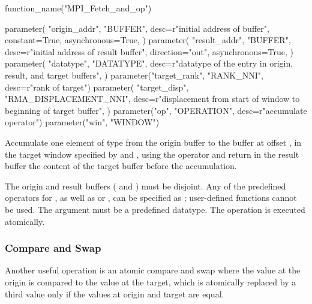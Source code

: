 %
%
%
\begin{mpi-binding}
    function_name("MPI_Fetch_and_op")
    
    parameter(
        "origin_addr",
        "BUFFER",
        desc=r"initial address of buffer",
        constant=True,
        asynchronous=True,
    )
    parameter(
        "result_addr",
        "BUFFER",
        desc=r"initial address of result buffer",
        direction="out",
        asynchronous=True,
    )
    parameter(
        "datatype",
        "DATATYPE",
        desc=r"datatype of the entry in origin, result, and target buffers",
    )
    parameter("target_rank", "RANK_NNI", desc=r"rank of target")
    parameter(
        "target_disp",
        "RMA_DISPLACEMENT_NNI",
        desc=r"displacement from start of window to beginning of target buffer",
    )
    parameter("op", "OPERATION", desc=r"accumulate operator")
    parameter("win", "WINDOW")
\end{mpi-binding}

Accumulate one element of type  from the origin buffer
 to the buffer at offset ,
in the target window specified by  and
, using the operator  and return in the result
buffer  the content of the target buffer before the
accumulation.

The origin and result buffers ( and
) must be disjoint.
Any of the predefined operators for , as well as
 or , can be specified as
; user-defined functions cannot be used. 
The  argument must be a predefined datatype.
The operation is executed atomically.


\subsubsection{Compare and Swap}
\label{sec:1sided-compareswap}

Another useful operation is an atomic compare and swap where the
value at the origin is compared to the value at the target,
which is atomically replaced by a third value only
if the values at origin and target are equal.

